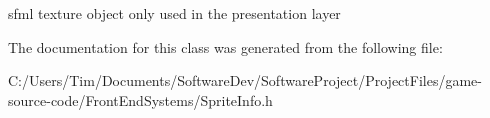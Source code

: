 sfml texture object only used in the presentation layer 

The documentation for this class was generated from the following file\+:\begin{DoxyCompactItemize}
\item 
C\+:/\+Users/\+Tim/\+Documents/\+Software\+Dev/\+Software\+Project/\+Project\+Files/game-\/source-\/code/\+Front\+End\+Systems/Sprite\+Info.\+h\end{DoxyCompactItemize}
